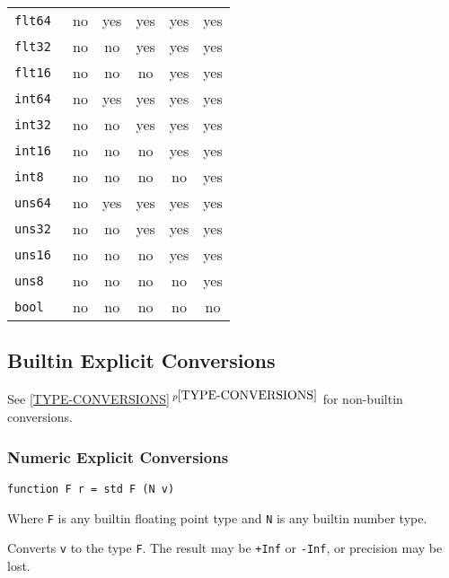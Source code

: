 \documentclass[12pt]{article}
\newcommand{\itemref}[1]{\ref{#1}$\,^{p\pageref{#1}}$}
\newenvironment{indpar}[1][0.3in]%
	{\begin{list}{}%
		     {\setlength{\itemsep}{0in}%
		      \setlength{\topsep}{0in}%
		      \setlength{\parsep}{1ex}%
		      \setlength{\labelwidth}{#1}%
		      \setlength{\leftmargin}{#1}%
		      \addtolength{\leftmargin}{\labelsep}}%
	 \item}%
	{\end{list}}
\begin{document}
\begin{center}
\begin{tabular}{l|c|c|c|c|c|}
\tt flt64 & no & yes & yes & yes & yes \\
\tt flt32 & no & no & yes & yes & yes \\
\tt flt16 & no & no & no & yes & yes
\\\hline
\tt int64 & no & yes & yes & yes & yes \\
\tt int32 & no & no & yes & yes & yes \\
\tt int16 & no & no & no & yes & yes \\
\tt int8 & no & no & no & no & yes
\\\hline
\tt uns64 & no & yes & yes & yes & yes \\
\tt uns32 & no & no & yes & yes & yes \\
\tt uns16 & no & no & no & yes & yes \\
\tt uns8 & no & no & no & no & yes
\\\hline
\tt bool & no & no & no & no & no
\\\hline
\end{tabular}
\end{center}

\subsection{Builtin Explicit Conversions}
\label{BUILTIN-EXPLICIT-CONVERSIONS}

See \itemref{TYPE-CONVERSIONS} for non-builtin conversions.

\subsubsection{Numeric Explicit Conversions}

{\tt function F r = std F (N v)}
\begin{indpar}
Where {\tt F} is any builtin floating point type
and {\tt N} is any builtin number type.

Converts {\tt v} to the type {\tt F}.  The result may be
{\tt +Inf} or {\tt -Inf}, or precision may be lost.
\end{indpar}
\end{document}
